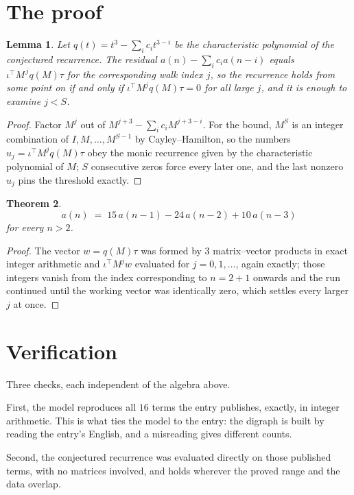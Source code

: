 \documentclass[11pt,a4paper]{article}
\theoremstyle{plain}
\newtheorem{theorem}{Theorem}
\newtheorem{lemma}[theorem]{Lemma}
\theoremstyle{definition}
\begin{document}
\section{The proof}

\begin{lemma}\label{lem:crit}
Let $q(t)=t^{3}-\sum_i c_it^{3-i}$ be the characteristic polynomial of the
conjectured recurrence. The residual $a(n)-\sum_ic_ia(n-i)$ equals
$\iota^{\!\top}M^{\,j}q(M)\tau$ for the corresponding walk index $j$, so the recurrence
holds from some point on if and only if $\iota^{\!\top}M^{j}q(M)\tau=0$ for all large $j$,
and it is enough to examine $j<S$.
\end{lemma}

\begin{proof}
Factor $M^{j}$ out of $M^{j+3}-\sum_ic_iM^{j+3-i}$. For the bound, $M^{S}$
is an integer combination of $I,M,\dots,M^{S-1}$ by Cayley--Hamilton, so the numbers
$u_j=\iota^{\!\top}M^{j}q(M)\tau$ obey the monic recurrence given by the characteristic
polynomial of $M$; $S$ consecutive zeros force every later one, and the last nonzero $u_j$
pins the threshold exactly.
\end{proof}

\begin{theorem}
\[
a(n)\;=\;15\,a(n-1) - 24\,a(n-2) + 10\,a(n-3)
\]
for every $n>2$.
\end{theorem}

\begin{proof}
The vector $w=q(M)\tau$ was formed by $3$ matrix--vector products in exact integer
arithmetic and $\iota^{\!\top}M^{j}w$ evaluated for $j=0,1,\dots$, again exactly; those
integers vanish from the index corresponding to $n=2+1$ onwards and the run continued
until the working vector was identically zero, which settles every larger $j$ at once.
\end{proof}

\section{Verification}

Three checks, each independent of the algebra above.

First, the model reproduces all $16$ terms the entry publishes, exactly, in integer
arithmetic. This is what ties the model to the entry: the digraph is built by reading the
entry's English, and a misreading gives different counts.

Second, the conjectured recurrence was evaluated directly on those published terms, with no
matrices involved, and holds wherever the proved range and the data overlap.
\end{document}
